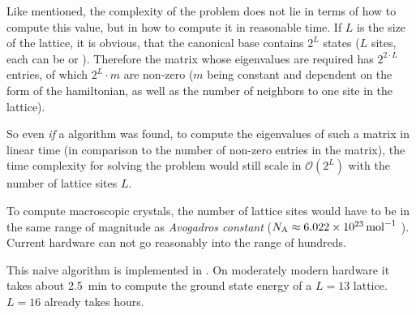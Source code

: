 Like mentioned, the complexity of the problem does not lie in terms of how to compute this value, but in how to compute it in reasonable time.
If $L$ is the size of the lattice, it is obvious, that the canonical base contains $2^L$ states ($L$ sites, each can be \up or \down).
Therefore the matrix whose eigenvalues are required has $2^{2\cdot L}$ entries, of which $2^L \cdot m$ are non-zero ($m$ being constant and dependent on the form of the hamiltonian, as well as the number of neighbors to one site in the lattice). 

So even \emph{if} a algorithm was found, to compute the eigenvalues of such a matrix in linear time (in comparison to the number of non-zero entries in the matrix), the time complexity for solving the problem would still scale in $\mathcal{O} (2^L)$ with the number of lattice sites $L$.

To compute macroscopic crystals, the number of lattice sites would have to be in the same range of magnitude as \emph{Avogadros constant} ($N_\mathrm{A} \approx \SI{6.022E23}{\per\mol}$ \cite{avogadrosNumber}). Current hardware can not go reasonably into the range of hundreds. 

This naive algorithm is implemented in . On moderately modern hardware it takes about \SI{2.5}{\minute} to compute the ground state energy of a $L=13$ lattice. $L=16$ already takes hours.